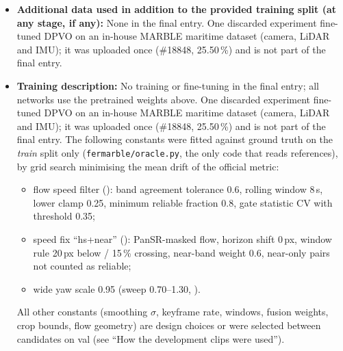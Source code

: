 \documentclass[11pt]{article}
\begin{document}
\begin{itemize}
\begin{itemize}[nosep]
        artist-created assets.
      \item PanSR~\cite{zust2026pansr}, Swin-L model, checkpoint \texttt{lojzezust/pansr-lars-swinl}
        \texttt{model.safetensors} (revision \texttt{ee6ae6a}); code \url{https://github.com/lojzezust/PanSR} commit
        \texttt{148183f} (Apache-2.0), built on Detectron2~\cite{wu2019detectron2}; trained on
        LaRS~\cite{zust2023lars}. Backbone initialisation of the released checkpoint and weights licence: not documented
        by the authors (PanSR's README recommends the ImageNet-22k Swin-L backbone for training from scratch; the code is
        Apache-2.0).
    \end{itemize}
  \item \textbf{Additional data used in addition to the provided training split (at any stage, if any):} None in the
    final entry. One discarded experiment fine-tuned DPVO on an in-house MARBLE maritime dataset (camera, LiDAR and IMU); it was uploaded once (\#18848, 25.50\,\%) and is not part of the final entry.
  \item \textbf{Training description:} No training or fine-tuning in the final entry; all networks use the pretrained
    weights above. One discarded experiment fine-tuned DPVO on an in-house MARBLE maritime dataset (camera, LiDAR and IMU); it was uploaded once (\#18848, 25.50\,\%) and is not part of the final entry.
    The following constants were fitted against ground truth on the \emph{train} split only (\texttt{fermarble/oracle.py},
    the only code that reads references), by grid search minimising the mean drift of the official metric:
    \begin{itemize}[nosep]
      \item flow speed filter (): band agreement tolerance 0.6,
        rolling window 8\,s, lower clamp 0.25, minimum reliable fraction 0.8, gate statistic CV with threshold 0.35;
      \item speed fix ``hs+near'' (): PanSR-masked flow, horizon
        shift 0\,px, window rule 20\,px below / 15\,\% crossing, near-band weight 0.6, near-only pairs not counted as reliable;
      \item wide yaw scale 0.95 (sweep 0.70--1.30, ).
    \end{itemize}
    All other constants (smoothing $\sigma$, keyframe rate, windows, fusion weights, crop bounds, flow geometry) are
    design choices or were selected between candidates on val (see ``How the development clips were used'').

\end{itemize}
\end{document}
